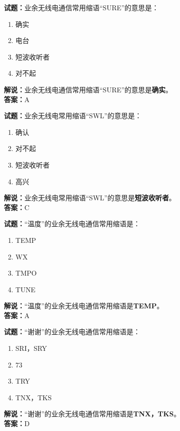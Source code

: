 \documentclass{ctexbook}
\begin{document}
\bigskip


\noindent\textbf{试题：}业余无线电通信常用缩语“SURE”的意思是：
\begin{enumerate}[leftmargin=3em]
\item 确实
\item 电台
\item 短波收听者
\item 对不起
\end{enumerate}
\noindent\textbf{解说：}业余无线电通信常用缩语“SURE”的意思是\textbf{确实}。\\\noindent\textbf{答案：}A


\bigskip


\noindent\textbf{试题：}业余无线电常用缩语“SWL”的意思是：
\begin{enumerate}[leftmargin=3em]
\item 确认
\item 对不起
\item 短波收听者
\item 高兴
\end{enumerate}
\noindent\textbf{解说：}业余无线电常用缩语“SWL”的意思是\textbf{短波收听者}。\\\noindent\textbf{答案：}C



\bigskip


\noindent\textbf{试题：}“温度”的业余无线电通信常用缩语是：
\begin{enumerate}[leftmargin=3em]
\item TEMP
\item WX
\item TMPO
\item TUNE
\end{enumerate}
\noindent\textbf{解说：}“温度”的业余无线电通信常用缩语是\textbf{TEMP}。\\\noindent\textbf{答案：}A


\bigskip


\noindent\textbf{试题：}“谢谢”的业余无线电通信常用缩语是：
\begin{enumerate}[leftmargin=3em]
\item SRI，SRY
\item 73
\item TRY
\item TNX，TKS
\end{enumerate}
\noindent\textbf{解说：}“谢谢”的业余无线电通信常用缩语是\textbf{TNX，TKS}。\\\noindent\textbf{答案：}D
\end{document}
